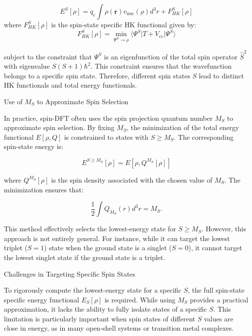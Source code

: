 \documentclass[%
 preprint, linenumbers,
 amsmath,amssymb,
 aps, physrev,
]{revtex4-2}
\begin{document}
\begin{equation}
    E^S[\rho] = q_e \int \rho(\mathbf{r}) v_{\text{nuc}}(\rho) d^3r + F_{HK}^{S}[\rho]
\end{equation}
where \( F_{HK}^{S}[\rho] \) is the spin-state specific HK functional given by:
\begin{equation}
    F_{HK}^{S}[\rho] = \min_{\Psi^S \to \rho} \langle \Psi^S | T + V_{ee} | \Psi^S \rangle
\end{equation}

subject to the constraint that \( \Psi^S \) is an eigenfunction of the total spin operator \( \hat{S}^2 \) with eigenvalue \( S(S + 1)\hbar^2 \). This constraint ensures that the wavefunction belongs to a specific spin state. Therefore, different spin states \( S \) lead to distinct HK functionals and total energy functionals.

Use of \( M_S \) to Approximate Spin Selection

In practice, spin-DFT often uses the spin projection quantum number \( M_S \) to approximate spin selection. By fixing \( M_S \), the minimization of the total energy functional \( E[\rho, Q] \) is constrained to states with \( S \geq M_S \). The corresponding spin-state energy is:

\begin{equation}
    E^{S \geq M_S}[\rho] = E[\rho, Q^{M_S}[\rho]]
\end{equation}

where \( Q^{M_S}[\rho] \) is the spin density associated with the chosen value of \( M_S \). The minimization ensures that:


\begin{equation}
    \frac{1}{2} \int Q_{M_S}(r) d^3r = M_S.
\end{equation}


This method effectively selects the lowest-energy state for \( S \geq M_S \). However, this approach is not entirely general. For instance, while it can target the lowest triplet (\( S = 1 \)) state when the ground state is a singlet (\( S = 0 \)), it cannot target the lowest singlet state if the ground state is a triplet.

 Challenges in Targeting Specific Spin States

To rigorously compute the lowest-energy state for a specific \( S \), the full spin-state specific energy functional \( E_S[\rho] \) is required. While using \( M_S \) provides a practical approximation, it lacks the ability to fully isolate states of a specific \( S \). This limitation is particularly important when spin states of different \( S \) values are close in energy, as in many open-shell systems or transition metal complexes.
\end{document}
